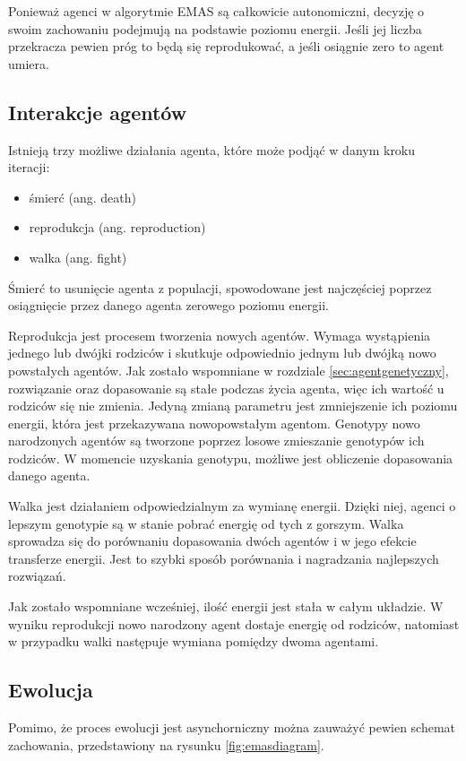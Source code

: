 Ponieważ agenci w algorytmie EMAS są całkowicie autonomiczni, decyzję o swoim zachowaniu podejmują na podstawie poziomu energii. Jeśli jej liczba przekracza pewien próg to będą się reprodukować, a jeśli osiągnie zero to agent umiera\cite{emas3}.


\subsection{Interakcje agentów}
Istnieją trzy możliwe działania agenta, które może podjąć w danym kroku iteracji:
\begin{itemize} 
\item śmierć (ang. death) 
\item reprodukcja (ang. reproduction) 
\item walka (ang. fight) 
\end{itemize}

Śmierć to usunięcie agenta z populacji, spowodowane jest najczęściej poprzez osiągnięcie przez danego agenta zerowego poziomu energii.

Reprodukcja jest procesem tworzenia nowych agentów. Wymaga wystąpienia jednego lub dwójki rodziców i skutkuje odpowiednio jednym lub dwójką nowo powstałych agentów. Jak zostało wspomniane w rozdziale \ref{sec:agentgenetyczny}, rozwiązanie oraz dopasowanie są stałe podczas życia agenta, więc ich wartość u rodziców się nie zmienia. Jedyną zmianą parametru jest zmniejszenie ich poziomu energii, która jest przekazywana nowopowstałym agentom. Genotypy nowo narodzonych agentów są tworzone poprzez losowe zmieszanie genotypów ich rodziców. W momencie uzyskania genotypu, możliwe jest obliczenie dopasowania danego agenta.

Walka jest działaniem odpowiedzialnym za wymianę energii. Dzięki niej, agenci o lepszym genotypie są w stanie pobrać energię od tych z gorszym. Walka sprowadza się do porównaniu dopasowania dwóch agentów i w jego efekcie transferze energii. Jest to szybki sposób porównania i nagradzania najlepszych rozwiązań.

Jak zostało wspomniane wcześniej, ilość energii jest stała w całym układzie. W wyniku reprodukcji nowo narodzony agent dostaje energię od rodziców, natomiast w przypadku walki następuje wymiana pomiędzy dwoma agentami.

\subsection{Ewolucja}

Pomimo, że proces ewolucji jest asynchorniczny można zauważyć pewien schemat zachowania, przedstawiony na rysunku \ref{fig:emasdiagram}.

